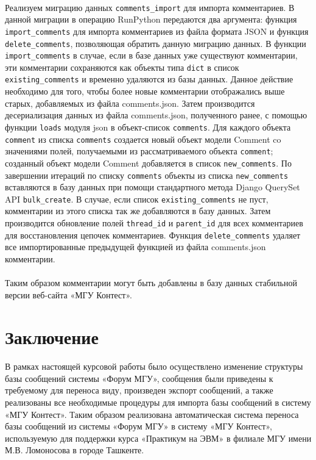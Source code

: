\documentclass[12pt, a4paper, oneside]{article}
\begin{document}
\paragraph{}
Реализуем миграцию данных \texttt{comments\_import} для импорта комментариев. В данной миграции в операцию RunPython передаются два аргумента: функция \texttt{import\_comments} для импорта комментариев из файла формата JSON и функция \texttt{delete\_comments}, позволяющая обратить данную миграцию данных. В функции \texttt{import\_comments} в случае, если в базе данных уже существуют комментарии, эти комментарии сохраняются как объекты типа \texttt{dict} в список \texttt{existing\_comments} и временно удаляются из базы данных. Данное действие необходимо для того, чтобы более новые комментарии отображались выше старых, добавляемых из файла comments.json. Затем производится десериализация данных из файла comments.json, полученного ранее, с помощью функции \texttt{loads} модуля json в объект-список \texttt{comments}. Для каждого объекта \texttt{comment} из списка \texttt{comments} создается новый объект модели Comment co значениями полей, получаемыми из рассматриваемого объекта \texttt{comment}; созданный объект модели Comment добавляется в список \texttt{new\_comments}. По завершении итераций по списку \texttt{comments} объекты из списка \texttt{new\_comments} вставляются в базу данных при помощи стандартного метода Django QuerySet API \texttt{bulk\_create}. В случае, если список \texttt{existing\_comments} не пуст, комментарии из этого списка так же добавляются в базу данных. Затем производится обновление полей \texttt{thread\_id} и \texttt{parent\_id} для всех комментариев для восстановления цепочек комментариев. Функция \texttt{delete\_comments} удаляет все импортированные предыдущей функцией из файла comments.json комментарии.
\paragraph{}
Таким образом комментарии могут быть добавлены в базу данных стабильной версии веб-сайта «МГУ Контест».
\vspace{1cm}

\newpage

\section{Заключение}
\paragraph{}
В рамках настоящей курсовой работы было осуществлено изменение структуры базы сообщений системы «Форум МГУ», сообщения были приведены к требуемому для переноса виду, произведен экспорт сообщений, а также реализованы все необходимые процедуры для импорта базы сообщений в систему «МГУ Контест». Таким образом реализована автоматическая система переноса базы сообщений из системы «Форум МГУ» в систему «МГУ Контест», используемую для поддержки курса «Практикум на ЭВМ» в филиале МГУ имени М.В. Ломоносова в городе Ташкенте.
\newpage
\end{document}
